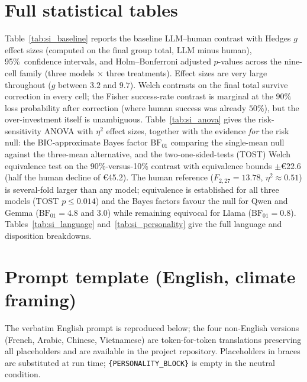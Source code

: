 \documentclass[11pt]{article}
\begin{document}
\section{Full statistical tables}

Table~\ref{tab:si_baseline} reports the baseline LLM--human contrast with Hedges
$g$ effect sizes (computed on the final group total, LLM minus human), 95\%\
confidence intervals, and Holm--Bonferroni adjusted $p$-values across the nine-cell
family (three models $\times$ three treatments). Effect sizes are very large
throughout ($g$ between $3.2$ and $9.7$). Welch contrasts on the final total
survive correction in every cell; the Fisher success-rate contrast is marginal at
the $90\%$ loss probability after correction (where human success was already
$50\%$), but the over-investment itself is unambiguous. Table~\ref{tab:si_anova}
gives the risk-sensitivity ANOVA with $\eta^2$ effect sizes, together with the
evidence \emph{for} the risk null: the BIC-approximate Bayes factor
$\mathrm{BF}_{01}$ \cite{wagenmakers2007practical} comparing the single-mean
null against the three-mean alternative, and the two-one-sided-tests (TOST)
Welch equivalence test \cite{lakens2018equivalence} on the 90\%-versus-10\%
contrast with equivalence bounds $\pm$€22.6 (half the human decline of €45.2).
The human reference ($F_{2,27}=13.78$, $\eta^2\approx0.51$) is several-fold
larger than any model; equivalence is established for all three models (TOST
$p\le0.014$) and the Bayes factors favour the null for Qwen and Gemma
($\mathrm{BF}_{01}=4.8$ and $3.0$) while remaining equivocal for Llama
($\mathrm{BF}_{01}=0.8$).
Tables~\ref{tab:si_language} and~\ref{tab:si_personality} give the full language
and disposition breakdowns.

\small

\normalsize

\section{Prompt template (English, climate framing)}

The verbatim English prompt is reproduced below; the four non-English versions
(French, Arabic, Chinese, Vietnamese) are token-for-token translations preserving
all placeholders and are available in the project repository. Placeholders in
braces are substituted at run time; \texttt{\{PERSONALITY\_BLOCK\}} is empty in
the neutral condition.
\end{document}
